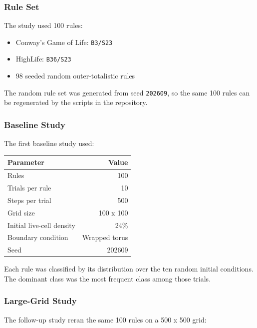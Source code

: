 \documentclass[
]{article}
\newcounter{none} %
\providecommand{\tightlist}{%
  \setlength{\itemsep}{0pt}\setlength{\parskip}{0pt}}
\begin{document}
\subsubsection{Rule Set}\label{rule-set}

The study used 100 rules:

\begin{itemize}
\tightlist
\item
  Conway's Game of Life: \texttt{B3/S23}
\item
  HighLife: \texttt{B36/S23}
\item
  98 seeded random outer-totalistic rules
\end{itemize}

The random rule set was generated from seed \texttt{202609}, so the same
100 rules can be regenerated by the scripts in the repository.

\subsubsection{Baseline Study}\label{baseline-study}

The first baseline study used:

{\def\LTcaptype{none} %
\begin{longtable}[]{@{}lr@{}}
\toprule\noalign{}
Parameter & Value \\
\midrule\noalign{}
\endhead
\bottomrule\noalign{}
\endlastfoot
Rules & 100 \\
Trials per rule & 10 \\
Steps per trial & 500 \\
Grid size & 100 x 100 \\
Initial live-cell density & 24\% \\
Boundary condition & Wrapped torus \\
Seed & 202609 \\
\end{longtable}
}

Each rule was classified by its distribution over the ten random initial
conditions. The dominant class was the most frequent class among those
trials.

\subsubsection{Large-Grid Study}\label{large-grid-study}

The follow-up study reran the same 100 rules on a 500 x 500 grid:
\end{document}
